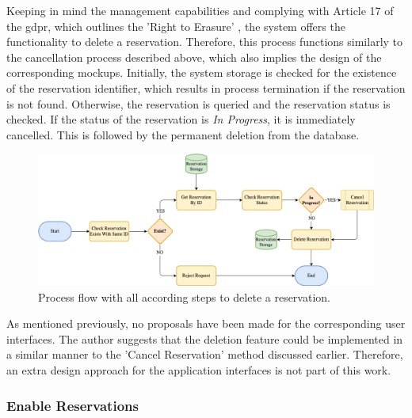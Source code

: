 Keeping in mind the management capabilities and complying with Article 17 of the \acrfull{gdpr}, which outlines the 'Right to Erasure' \cite{noauthor_art_2018}, the system offers the functionality to delete a reservation.
Therefore, this process functions similarly to the cancellation process described above, which also implies the design of the corresponding mockups.
Initially, the system storage is checked for the existence of the reservation identifier, which results in process termination if the reservation is not found. 
Otherwise, the reservation is queried and the reservation status is checked. If the status of the reservation is \textit{In Progress}, it is immediately cancelled. This is followed by the permanent deletion from the database. 

\begin{figure}[h]
    \centering
    \includegraphics[scale=0.4]{resources/images/main/5_design/processes/ReservationDelete.png}
    \caption{Process flow with all according steps to delete a reservation.}
    \label{fig:delete-reservation-flowchart}
\end{figure}

\noindent As mentioned previously, no proposals have been made for the corresponding user interfaces. The author suggests that the deletion feature could be implemented in a similar manner to the 'Cancel Reservation' method discussed earlier. Therefore, an extra design approach for the application interfaces is not part of this work.

\newpage

\subsubsection{Enable Reservations}
\label{ch:Design:sec:Reservation System:ssec:Management Capabilities:sssec:Enable Reservations}

